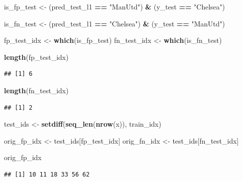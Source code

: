\documentclass[
]{article}
\newenvironment{Shaded}{\begin{snugshade}}{\end{snugshade}}
\newcommand{\FunctionTok}[1]{\textcolor[rgb]{0.13,0.29,0.53}{\textbf{#1}}}
\newcommand{\NormalTok}[1]{#1}
\newcommand{\OtherTok}[1]{\textcolor[rgb]{0.56,0.35,0.01}{#1}}
\newcommand{\SpecialCharTok}[1]{\textcolor[rgb]{0.81,0.36,0.00}{\textbf{#1}}}
\newcommand{\StringTok}[1]{\textcolor[rgb]{0.31,0.60,0.02}{#1}}
\begin{document}
\begin{Shaded}
\begin{Highlighting}[]
\NormalTok{is\_fp\_test }\OtherTok{\textless{}{-}}\NormalTok{ (pred\_test\_l1 }\SpecialCharTok{==} \StringTok{"ManUtd"}\NormalTok{) }\SpecialCharTok{\&}\NormalTok{ (y\_test }\SpecialCharTok{==} \StringTok{"Chelsea"}\NormalTok{)}

\NormalTok{is\_fn\_test }\OtherTok{\textless{}{-}}\NormalTok{ (pred\_test\_l1 }\SpecialCharTok{==} \StringTok{"Chelsea"}\NormalTok{) }\SpecialCharTok{\&}\NormalTok{ (y\_test }\SpecialCharTok{==} \StringTok{"ManUtd"}\NormalTok{)}

\NormalTok{fp\_test\_idx }\OtherTok{\textless{}{-}} \FunctionTok{which}\NormalTok{(is\_fp\_test)}
\NormalTok{fn\_test\_idx }\OtherTok{\textless{}{-}} \FunctionTok{which}\NormalTok{(is\_fn\_test)}

\FunctionTok{length}\NormalTok{(fp\_test\_idx)  }
\end{Highlighting}
\end{Shaded}

\begin{verbatim}
## [1] 6
\end{verbatim}

\begin{Shaded}
\begin{Highlighting}[]
\FunctionTok{length}\NormalTok{(fn\_test\_idx) }
\end{Highlighting}
\end{Shaded}

\begin{verbatim}
## [1] 2
\end{verbatim}

\begin{Shaded}
\begin{Highlighting}[]
\NormalTok{test\_ids }\OtherTok{\textless{}{-}} \FunctionTok{setdiff}\NormalTok{(}\FunctionTok{seq\_len}\NormalTok{(}\FunctionTok{nrow}\NormalTok{(x)), train\_idx)}

\NormalTok{orig\_fp\_idx }\OtherTok{\textless{}{-}}\NormalTok{ test\_ids[fp\_test\_idx]}
\NormalTok{orig\_fn\_idx }\OtherTok{\textless{}{-}}\NormalTok{ test\_ids[fn\_test\_idx]}

\NormalTok{orig\_fp\_idx}
\end{Highlighting}
\end{Shaded}

\begin{verbatim}
## [1] 10 11 18 33 56 62
\end{verbatim}
\end{document}
